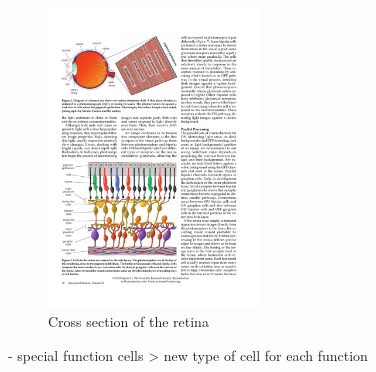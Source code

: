 		\begin{figure}[H]
			\centering
			\includegraphics[width=0.5\textwidth, trim=1cm 5cm 8cm 15cm, clip]{images/kolb-2003-howtheretinaworks-p3.pdf}
			\caption{Cross section of the retina \citep{kolb2003retina}}
		\end{figure}
		
		- special function cells > new type of cell for each function
		

